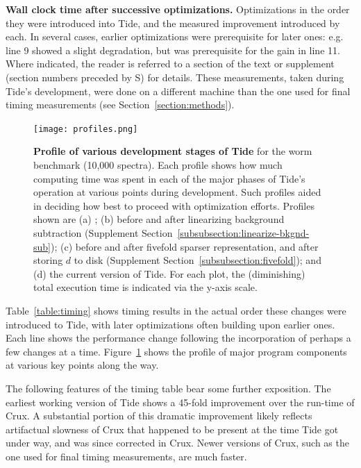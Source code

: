 \begin{table}
\centering

\caption{{\bf Wall clock time after successive optimizations.}
  Optimizations in the order they were introduced into Tide, and the
  measured improvement introduced by each. In several cases, earlier
  optimizations were prerequisite for later ones: e.g. line 9 showed a
  slight degradation, but was prerequisite for the gain in line
  11. Where indicated, the reader is referred to a section of the text
  or supplement (section numbers preceded by S) for details.  These
  measurements, taken during Tide's development, were done on a
  different machine than the one used for final timing measurements
  (see Section~\ref{section:methods}).
  \label{table:timing}}
\end{table}

\begin{figure}
\centering
\texttt{[image: profiles.png]}
\caption{{\bf Profile of various development stages of Tide} for the worm
  benchmark (10,000 spectra).  Each profile shows how much computing
  time was spent in each of the major phases of Tide's operation at
  various points during development.  Such profiles aided in deciding
  how best to proceed with optimization efforts. Profiles shown are
  (a) \tidezero; (b) before and after linearizing background
  subtraction (Supplement
  Section~\ref{subsubsection:linearize-bkgnd-sub}); (c) before and
  after fivefold sparser representation, and after storing $d$ to disk
  (Supplement Section~\ref{subsubsection:fivefold}); and (d) the
  current version of Tide. For each plot, the (diminishing) total
  execution time is indicated via the y-axis scale.
  \label{figure:profiles}}
\end{figure}

Table~\ref{table:timing} shows timing results in the actual order
these changes were introduced to Tide, with later optimizations often
building upon earlier ones. Each line shows the performance change
following the incorporation of perhaps a few changes at a
time. Figure~\ref{figure:profiles} shows the profile of major program
components at various key points along the way.

The following features of the timing table bear some further
exposition. The earliest working version of Tide shows a 45-fold
improvement over the run-time of Crux. A substantial portion of this
dramatic improvement likely reflects artifactual slowness of Crux that
happened to be present at the time Tide got under way, and was since
corrected in Crux. Newer versions of Crux, such as the one used for final
timing measurements, are much faster.

